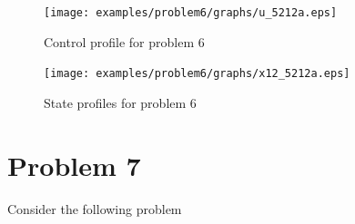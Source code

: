 \begin{figure}[htb]
\begin{minipage}[t]{0.5\linewidth}
\centering
\texttt{[image: examples/problem6/graphs/u\_5212a.eps]}
\caption[Problem 6: Control profile]{Control profile for problem 6}
\label{fig:prob6_u} 
\end{minipage}
\begin{minipage}[t]{0.5\linewidth}
\centering
\texttt{[image: examples/problem6/graphs/x12\_5212a.eps]}
\caption[Problem 6: State profiles]{State profiles for problem 6}
\label{fig:prob6_x}  
\end{minipage}
\end{figure}

\section{Problem 7}
\label{sec:prob7}

Consider the following problem~\citep{luu90_52,bal01,fik02} 

